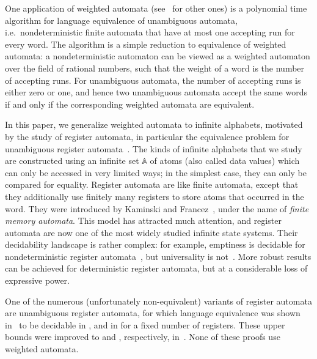 \documentclass{theoretics}
\newcommand{\atoms}{\mathbb A}
\newcommand{\exptime}{{\sc{ExpTime}}\xspace }
\newcommand{\twoexpspace}{{\sc{2ExpSpace}}\xspace }
\newcommand{\twoexptime}{{\sc{2ExpTime}}\xspace }
\newcommand{\expspace}{{\sc{ExpSpace}}\xspace }
\begin{document}
One application of weighted automata (see~\cite{balle2015learning} for other ones) is a polynomial time algorithm for  language equivalence of unambiguous automata, i.e.~nondeterministic finite automata that have at most one accepting run for every  word. The algorithm is a simple reduction to equivalence of weighted automata:  a nondeterministic automaton can be viewed as a weighted automaton over the field of rational numbers, such that the weight of a  word is the number of accepting runs. For unambiguous automata, the number of accepting runs is either zero or one, and hence two unambiguous automata accept the same words if and only if the corresponding weighted automata are equivalent.

In this paper, we generalize weighted automata to infinite alphabets, motivated by the study of register automata, in particular the equivalence problem for unambiguous register automata~\cite{clementeUnamb2021, Colcombet15, MottetQ19Guessing, MottetQ19}.  The kinds of infinite alphabets that we study are constructed  using an infinite set $\atoms$ of atoms (also called data values) which can only be accessed in very limited ways; in the simplest case, they can only be compared for equality. Register automata are like finite  automata, except that they additionally use finitely many registers to store atoms that occurred in the  word.
They were introduced by Kaminski and Francez~\cite[Def.~1]{kaminskiFiniteMemoryAutomata1994}, under the name of \emph{finite memory automata}. This model has attracted much attention, and register automata are now one of the most widely studied  infinite state systems. Their decidability landscape is rather complex: for example, emptiness is decidable for nondeterministic register automata~\cite[Thm.~1]{kaminskiFiniteMemoryAutomata1994}, but universality is not~\cite[Thm~5.1]{nevenFiniteStateMachines2004}. More robust results can be achieved for deterministic register automata, but at a considerable loss of expressive power.

One of the numerous (unfortunately non-equivalent) variants of register automata are unambiguous register automata, for which  language equivalence was shown in~\cite[Thm.~1]{MottetQ19} to be  decidable in \twoexpspace, and in \expspace for a fixed number of registers. 
 These upper bounds were improved to \twoexptime and \exptime, respectively, in~\cite[Thm.~2]{clementeUnamb2021}. None of these proofs use weighted automata.
\end{document}
